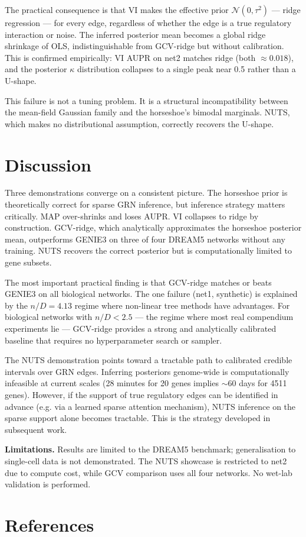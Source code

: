 \documentclass[11pt]{article}
\begin{document}
The practical consequence is that VI makes the effective prior $\mathcal{N}(0, \tau^2)$
--- ridge regression --- for every edge, regardless of whether the edge is a true
regulatory interaction or noise. The inferred posterior mean becomes a global ridge
shrinkage of OLS, indistinguishable from GCV-ridge but without calibration. This is
confirmed empirically: VI AUPR on net2 matches ridge (both $\approx 0.018$), and the
posterior $\kappa$ distribution collapses to a single peak near 0.5 rather than a
U-shape.

This failure is not a tuning problem. It is a structural incompatibility between the
mean-field Gaussian family and the horseshoe's bimodal marginals. NUTS, which makes no
distributional assumption, correctly recovers the U-shape.

\section{Discussion}

Three demonstrations converge on a consistent picture. The horseshoe prior is
theoretically correct for sparse GRN inference, but inference strategy matters
critically. MAP over-shrinks and loses AUPR. VI collapses to ridge by construction.
GCV-ridge, which analytically approximates the horseshoe posterior mean, outperforms
GENIE3 on three of four DREAM5 networks without any training. NUTS recovers the correct
posterior but is computationally limited to gene subsets.

The most important practical finding is that GCV-ridge matches or beats GENIE3 on all
biological networks. The one failure (net1, synthetic) is explained by the $n/D = 4.13$
regime where non-linear tree methods have advantages. For biological networks with
$n/D < 2.5$ --- the regime where most real compendium experiments lie --- GCV-ridge
provides a strong and analytically calibrated baseline that requires no hyperparameter
search or sampler.

The NUTS demonstration points toward a tractable path to calibrated credible intervals
over GRN edges. Inferring posteriors genome-wide is computationally infeasible at current
scales (28 minutes for 20 genes implies $\sim$60 days for 4511 genes). However, if the
support of true regulatory edges can be identified in advance (e.g. via a learned sparse
attention mechanism), NUTS inference on the sparse support alone becomes tractable. This
is the strategy developed in subsequent work.

\textbf{Limitations.} Results are limited to the DREAM5 benchmark; generalisation to
single-cell data is not demonstrated. The NUTS showcase is restricted to net2 due to
compute cost, while GCV comparison uses all four networks. No wet-lab validation is
performed.

\section*{References}


\end{document}
